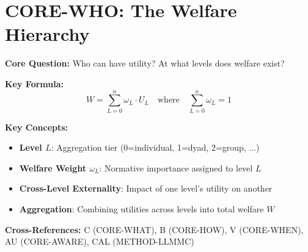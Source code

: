 
\chapter{CORE-WHO: The Welfare Hierarchy}
\label{app:core-who}

\begin{abstract}
This appendix answers the first fundamental question of the Evidence-Based Framework:
\textit{``Who can have utility?''} We establish that welfare exists at multiple
aggregation levels $L \in \{0, 1, 2, \ldots, n\}$, from individual ($L=0$) through
dyadic ($L=1$), group ($L=2$), organizational ($L=3$), to societal ($L=n$) levels.
The axiom system UNMAPPED_SRL-1 through UNMAPPED_SRL-8 formalizes the conditions for well-defined
cross-level aggregation, ensuring Pareto consistency and addressing the problem
of double-counting. This hierarchy is foundational: WHAT (C), HOW (B), and WHEN (V)
all presuppose answers to WHO.
\end{abstract}


\begin{tcolorbox}[colback=blue!5!white, colframe=blue!75!black,
    title=Quick Reference: CORE-WHO]

\textbf{Core Question:} Who can have utility? At what levels does welfare exist?

\textbf{Key Formula:}
\begin{equation}
W = \sum_{L=0}^{n} \omega_L \cdot U_L \quad \text{where} \quad \sum_{L=0}^{n} \omega_L = 1
\label{eq:who-aggregation}
\end{equation}

\textbf{Key Concepts:}
\begin{itemize}[nosep]
\item \textbf{Level $L$}: Aggregation tier (0=individual, 1=dyad, 2=group, ...)
\item \textbf{Welfare Weight $\omega_L$}: Normative importance assigned to level $L$
\item \textbf{Cross-Level Externality}: Impact of one level's utility on another
\item \textbf{Aggregation}: Combining utilities across levels into total welfare $W$
\end{itemize}

\textbf{Cross-References:}
C (CORE-WHAT), B (CORE-HOW), V (CORE-WHEN), AU (CORE-AWARE), CAL (METHOD-LLMMC)

\end{tcolorbox}


